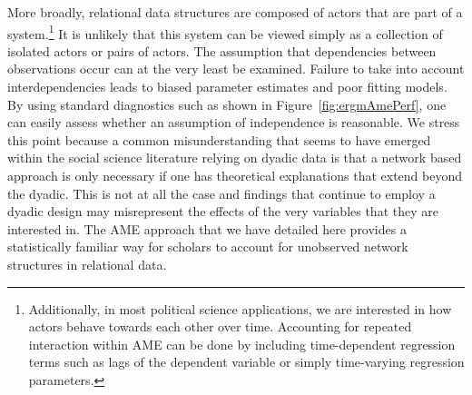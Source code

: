 More broadly, relational data structures are composed of actors that are part of a system.\footnote{Additionally, in most political science applications, we are interested in how actors behave towards each other over time. Accounting for repeated interaction within AME can be done by including time-dependent regression terms such as lags of the dependent variable or simply time-varying regression parameters.} It is unlikely that this system can be viewed simply as a collection of isolated actors or pairs of actors. The assumption  that dependencies between observations occur can at the very least be examined. Failure to take into account interdependencies leads to biased parameter estimates and poor fitting models. By using standard diagnostics such as shown in Figure~\ref{fig:ergmAmePerf}, one can easily assess whether an assumption of independence is reasonable. We stress this point because a common misunderstanding that seems to have emerged within the social science literature relying on dyadic data is that a network based approach is only necessary if one has theoretical explanations that extend beyond the dyadic. This is not at all the case and findings that continue to employ a dyadic design may misrepresent the effects of the very variables that they are interested in. The AME approach that we have detailed here provides a statistically familiar way for scholars to account for unobserved network structures in relational data. 